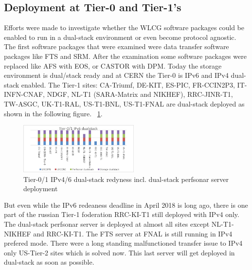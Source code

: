
%

\subsection{Deployment at Tier-0 and Tier-1's}
Efforts were made to investigate whether the WLCG software packages could be enabled to run in a dual-stack environment or even become protocol agnostic. The first software packages that were examined were data transfer software packages like FTS and SRM. After the examination some software packages were replaced like AFS with EOS, or CASTOR with DPM. Today the storage environment is dual/stack ready and at CERN the Tier-0 is IPv6 and IPv4 dual-stack enabled. The Tier-1 sites: CA-Triumf, DE-KIT, ES-PIC, FR-CCIN2P3, IT-INFN-CNAF, NDGF, NL-T1 (SARA-Matrix and NIKHEF), RRC-JINR-T1, TW-ASGC, UK-T1-RAL, US-T1-BNL, US-T1-FNAL are dual-stack deployed as shown in the following figure. ~\ref{fig:t1ds}.
\begin{figure}[h]
\centering
\includegraphics[width=6cm]{hepix-ipv6-tier01-dual-stack}
\caption{Tier-0/1 IPv4/6 dual-stack redyness incl. dual-stack perfsonar server deployment}
\label{fig:t1ds}
\end{figure}
But even while the IPv6 redeaness deadline in April 2018 is long ago, there is one part of the russian Tier-1 foderation RRC-KI-T1 still deployed with IPv4 only. The dual-stack perfsonar server is deployed at almost all sites except NL-T1-NIKHEF and RRC-KI-T1. The FTS server at FNAL is still running in IPv4 prefered mode. There were a long standing malfunctioned transfer issue to IPv4 only US-Tier-2 sites which is solved now. This last server will get deployed in dual-stack as soon as possible.

